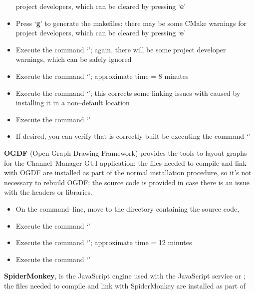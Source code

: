 \begin{itemize}
project developers, which can be cleared by pressing `\textbf{e}'
\item Press `\textbf{g}' to generate the makefiles; there may be some CMake warnings for
project developers, which can be cleared by pressing `\textbf{e}'
\item Execute the command `'; again, there will be some project developer
warnings, which can be safely ignored
\item Execute the command `'; approximate time = 8 minutes
\item Execute the command `'; this corrects some linking
issues with \yarp{} caused by installing it in a non--default location
\item Execute the command `'
\item If desired, you can verify that \yarp{} is correctly built be executing the command
`'
\end{itemize}
\tertiaryEnd{}
\TBD{}
\tertiaryEnd{}
\TBD{}
\tertiaryEnd{}
\secondaryEnd{}
\textbf{OGDF} (Open Graph Drawing Framework) provides the tools to layout graphs for the
Channel~Manager GUI application; the files needed to compile and link with OGDF are
installed as part of the normal \mplusm{} installation procedure, so it's not necessary to
rebuild OGDF; the source code is provided in case there is an issue with the headers or
libraries.
\begin{itemize}
\item On the command--line, move to the directory containing the \mplusm{} source code,
\item Execute the command `'
\item Execute the command `'; approximate time
= 12 minutes
\item Execute the command `'
\end{itemize}
\tertiaryEnd{}
\TBD{}
\tertiaryEnd{}
\TBD{}
\tertiaryEnd{}
\secondaryEnd{}
\textbf{SpiderMonkey}, is the JavaScript engine used with the JavaScript service or
\mplusm{}; the files needed to compile and link with SpiderMonkey are installed as part of
